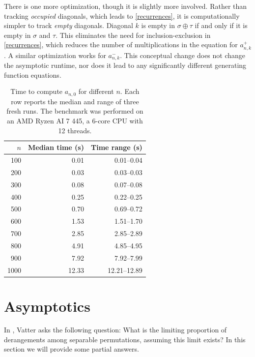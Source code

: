 \documentclass{article}
\theoremstyle{plain}
\theoremstyle{definition}
\theoremstyle{plain}
\begin{document}
There is one more optimization, though it is slightly more involved. Rather than
tracking \emph{occupied} diagonals, which leads to \eqref{recurrences}, it is
computationally simpler to track \emph{empty} diagonals. Diagonal $k$ is empty
in $\sigma \oplus \tau$ if and only if it is empty in $\sigma$ and $\tau$. This
eliminates the need for inclusion-exclusion in \eqref{recurrences}, which
reduces the number of multiplications in the equation for $a^+_{n,k}$. A similar
optimization works for $a^-_{n,k}$. This conceptual change does not change the
asymptotic runtime, nor does it lead to any significantly different generating
function equations.

\begin{table}[t]
    \centering
    \begin{tabular}{r|r|r}
        $n$
        & Median time (s)
        & Time range (s) \\
        \hline
         100 &  0.01 &  0.01--0.04 \\
         200 &  0.03 &  0.03--0.03 \\
         300 &  0.08 &  0.07--0.08 \\
         400 &  0.25 &  0.22--0.25 \\
         500 &  0.70 &  0.69--0.72 \\
         600 &  1.53 &  1.51--1.70 \\
         700 &  2.85 &  2.85--2.89 \\
         800 &  4.91 &  4.85--4.95 \\
         900 &  7.92 &  7.92--7.99 \\
        1000 & 12.33 & 12.21--12.89
    \end{tabular}
    \caption{Time to compute $a_{n, 0}$ for different $n$. Each row reports the
    median and range of three fresh runs. The benchmark was performed on an AMD Ryzen AI 7 445, a 6-core CPU with 12 threads.}
    \label{tab:sepder-benchmark}
\end{table}

\section{Asymptotics}
\label{sec:asymptotics}

In \cite[Question 4.5]{Vatter2026Problems}, Vatter asks the following question:
What is the limiting proportion of derangements among separable permutations,
assuming this limit exists? In this section we will provide some partial
answers.
\end{document}
